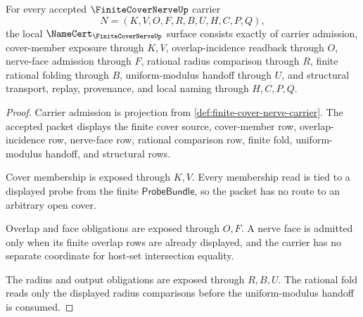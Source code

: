\begin{theorem}
\label{thm:finite-cover-nerve-namecert-obligations}
For every accepted $\FiniteCoverNerveUp$ carrier
$$
N=(K,V,O,F,R,B,U,H,C,P,Q),
$$
the local $\NameCert_{\FiniteCoverNerveUp}$ surface consists exactly of carrier admission, cover-member exposure through $K,V$, overlap-incidence readback through $O$, nerve-face admission through $F$, rational radius comparison through $R$, finite rational folding through $B$, uniform-modulus handoff through $U$, and structural transport, replay, provenance, and local naming through $H,C,P,Q$.
\end{theorem}
\begin{proof}
Carrier admission is projection from \autoref{def:finite-cover-nerve-carrier}. The accepted packet displays the finite cover source, cover-member row, overlap-incidence row, nerve-face row, rational comparison row, finite fold, uniform-modulus handoff, and structural rows.

Cover membership is exposed through $K,V$. Every membership read is tied to a displayed probe from the finite $\mathsf{ProbeBundle}$, so the packet has no route to an arbitrary open cover.

Overlap and face obligations are exposed through $O,F$. A nerve face is admitted only when its finite overlap rows are already displayed, and the carrier has no separate coordinate for host-set intersection equality.

The radius and output obligations are exposed through $R,B,U$. The rational fold reads only the displayed radius comparisons before the uniform-modulus handoff is consumed.
\end{proof}

